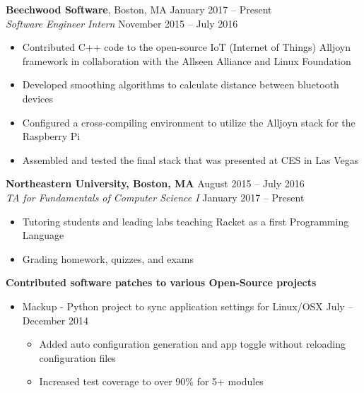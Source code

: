 \documentclass[overlapped,line]{res}
\begin{document}
\begin{resume}
\textbf{Beechwood Software}, Boston, MA \hfill January 2017 \--- Present\\
                 {\sl Software Engineer Intern} \hfill November 2015 \--- July 2016 
                 \begin{itemize}  \itemsep -2pt
                 \item Contributed C++ code to the open-source IoT (Internet of Things) Alljoyn framework in collaboration with the Allseen Alliance and Linux Foundation 
                 \item Developed smoothing algorithms to calculate distance between bluetooth devices 
                 \item Configured a cross-compiling environment to utilize the Alljoyn stack for the Raspberry Pi 
                 \item Assembled and tested the final stack that was presented at CES in Las Vegas
                \end{itemize}
              	\textbf{Northeastern University, Boston, MA } \hfill August 2015 \--- July 2016 \\ 
              	{\sl TA for Fundamentals of Computer Science I} \hfill January 2017 \--- Present
              	\begin{itemize} \itemsep -2pt
              	\item Tutoring students and leading labs teaching Racket as a first Programming Language
              	\item Grading homework, quizzes, and exams
              	\end{itemize}
                \textbf{Contributed software patches to various Open-Source projects}
                  \begin{itemize}  \itemsep -7pt
                  \item Mackup - Python project to sync application settings for Linux/OSX \hfill July \--- December 2014
                   		\begin{itemize} \itemsep 5pt \parskip -7pt
                   		\item Added auto configuration generation and app toggle without reloading configuration files
                   		\item Increased test coverage to over 90\% for 5+ modules
                   		\end{itemize} 
                  \end{itemize}
\noindent\makebox[6.5in]{\rule{6.5in}{0.4pt}}

\end{resume}
\end{document}
